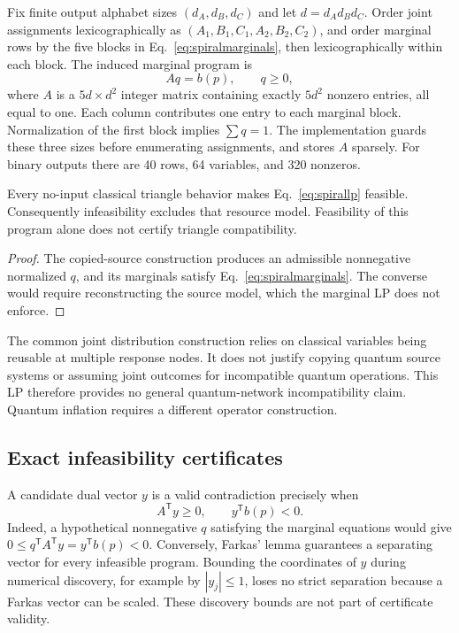 Fix finite output alphabet sizes $(d_A,d_B,d_C)$ and let
$d=d_Ad_Bd_C$. Order joint assignments lexicographically as
$(A_1,B_1,C_1,A_2,B_2,C_2)$, and order marginal rows by the five blocks in
Eq.~\eqref{eq:spiralmarginals}, then lexicographically within each block.
The induced marginal program is
\begin{equation}
 Aq=b(p),\qquad q\geq0,
 \label{eq:spirallp}
\end{equation}
where $A$ is a $5d\times d^2$ integer matrix containing exactly $5d^2$
nonzero entries, all equal to one. Each column contributes one entry to each
marginal block. Normalization of the first block implies $\sum q=1$.
The implementation guards these three sizes before enumerating
assignments, and stores $A$ sparsely. For binary outputs there are 40 rows,
64 variables, and 320 nonzeros.

\begin{proposition}
Every no-input classical triangle behavior makes
Eq.~\eqref{eq:spirallp} feasible. Consequently infeasibility excludes that
resource model. Feasibility of this program alone does not certify triangle
compatibility.
\end{proposition}
\begin{proof}
The copied-source construction produces an admissible nonnegative normalized
$q$, and its marginals satisfy Eq.~\eqref{eq:spiralmarginals}. The converse
would require reconstructing the source model, which the marginal LP does
not enforce.
\end{proof}
The common joint distribution construction relies on classical variables
being reusable at multiple response nodes. It does not justify copying
quantum source systems or assuming joint outcomes for incompatible quantum
operations. This LP therefore provides no general quantum-network
incompatibility claim. Quantum inflation requires a different operator
construction.

\subsection{Exact infeasibility certificates}
A candidate dual vector $y$ is a valid contradiction precisely when
\begin{equation}
 A^{\mathsf T}y\geq0,\qquad y^{\mathsf T}b(p)<0.
 \label{eq:spiralfarkas}
\end{equation}
Indeed, a hypothetical nonnegative $q$ satisfying the marginal equations
would give $0\leq q^{\mathsf T}A^{\mathsf T}y=y^{\mathsf T}b(p)<0$.
Conversely, Farkas' lemma guarantees a separating vector for every infeasible
program. Bounding the coordinates of $y$ during numerical discovery, for
example by $|y_j|\leq1$, loses no strict separation because a Farkas vector
can be scaled. These discovery bounds are not part of certificate validity.

